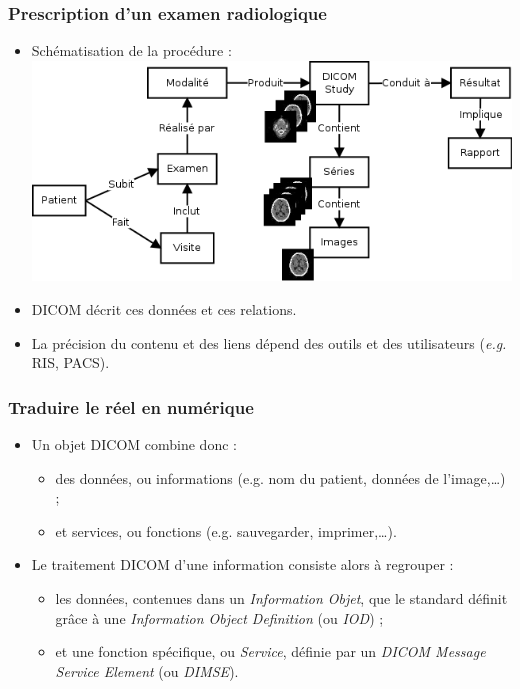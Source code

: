 	\frame
	{
		\frametitle{Prescription d'un examen radiologique}
		\begin{itemize}
			\item Sch\'ematisation de la proc\'edure :
			\includegraphics[width=\linewidth]{./figures/scenario.png}
			\item<2-> DICOM d\'ecrit ces donn\'ees et ces relations.
			\item<3-> La pr\'ecision du contenu et des liens d\'epend des outils et des utilisateurs (\emph{e.g.} RIS, PACS).
		\end{itemize}
	}

	\frame
	{
		\frametitle{Traduire le r\'eel en num\'erique}
		
		\begin{itemize}
			\item Un objet DICOM combine donc :
			\begin{itemize}
				\item<2-> des donn\'ees, ou informations (e.g. nom du patient, donn\'ees de l'image,\ldots) ;
				\item<3-> et services, ou fonctions (e.g. sauvegarder, imprimer,\ldots).
			\end{itemize}
			
			\item<4-> Le traitement DICOM d'une information consiste alors \`a regrouper :
			\begin{itemize}
				\item<5-> les donn\'ees, contenues dans un \emph{Information Objet}, que le standard d\'efinit gr\^ace \`a une \emph{Information Object Definition} (ou \emph{IOD}) ;
				\item<6-> et une fonction sp\'ecifique, ou \emph{Service}, d\'efinie par un \emph{DICOM Message Service Element} (ou \emph{DIMSE}).
			\end{itemize}
		\end{itemize}
	}
	
